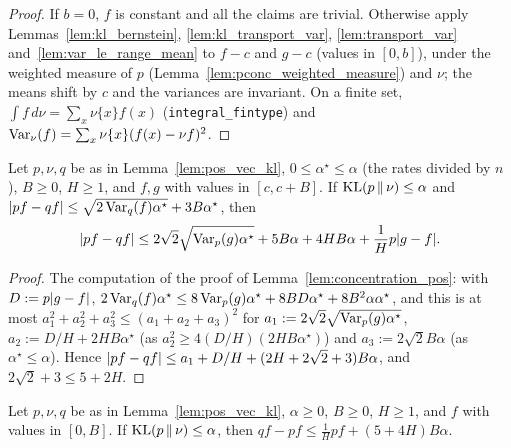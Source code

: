 \begin{proof}
\leanok
If $b = 0$, $f$ is constant and all the claims are trivial. Otherwise apply
Lemmas~\ref{lem:kl_bernstein}, \ref{lem:kl_transport_var}, \ref{lem:transport_var}
and~\ref{lem:var_le_range_mean} to $f - c$ and $g - c$ (values in $[0, b]$), under the weighted
measure of $p$ (Lemma~\ref{lem:pconc_weighted_measure}) and $\nu$; the means shift by $c$ and the
variances are invariant. On a finite set, $\int f\,d\nu = \sum_x\nu\{x\}f(x)$
(\texttt{integral\_fintype}) and $\operatorname{Var}_\nu(f) = \sum_x \nu\{x\}(f(x) - \nu f)^2$.
\end{proof}

\begin{lemma}\label{lem:pos_core_concentration}
\leanok
{}
Let $p, \nu, q$ be as in Lemma~\ref{lem:pos_vec_kl}, $0 \le \alpha^\star \le \alpha$ (the rates divided by
$n$), $B \ge 0$, $H \ge 1$, and $f, g$ with values in $[c, c + B]$. If $\mathrm{KL}(p \,\|\, \nu) \le \alpha$ and
$\lvert pf - qf \rvert \le \sqrt{2\operatorname{Var}_q(f)\alpha^\star} + 3B\alpha^\star$, then
\[
  \lvert pf - qf \rvert \le 2\sqrt2\sqrt{\operatorname{Var}_p(g)\alpha^\star} + 5B\alpha + 4HB\alpha + \frac1H p\lvert g - f \rvert .
\]
\end{lemma}

\begin{proof}
\leanok
The computation of the proof of Lemma~\ref{lem:concentration_pos}: with $D := p\lvert g - f \rvert$,
$2\operatorname{Var}_q(f)\alpha^\star \le 8\operatorname{Var}_p(g)\alpha^\star + 8BD\alpha^\star + 8B^2\alpha\alpha^\star$, and this is at most
$a_1^2 + a_2^2 + a_3^2 \le (a_1 + a_2 + a_3)^2$ for $a_1 := 2\sqrt2\sqrt{\operatorname{Var}_p(g)\alpha^\star}$,
$a_2 := D/H + 2HB\alpha^\star$ (as $a_2^2 \ge 4(D/H)(2HB\alpha^\star)$) and $a_3 := 2\sqrt2 B\alpha$ (as
$\alpha^\star \le \alpha$). Hence $\lvert pf - qf \rvert \le a_1 + D/H + (2H + 2\sqrt2 + 3)B\alpha$, and
$2\sqrt2 + 3 \le 5 + 2H$.
\end{proof}

\begin{lemma}\label{lem:pos_core_third_term}
\leanok
{}
Let $p, \nu, q$ be as in Lemma~\ref{lem:pos_vec_kl}, $\alpha \ge 0$, $B \ge 0$, $H \ge 1$, and $f$ with
values in $[0, B]$. If $\mathrm{KL}(p \,\|\, \nu) \le \alpha$, then $qf - pf \le \frac1H pf + (5 + 4H)B\alpha$.
\end{lemma}

